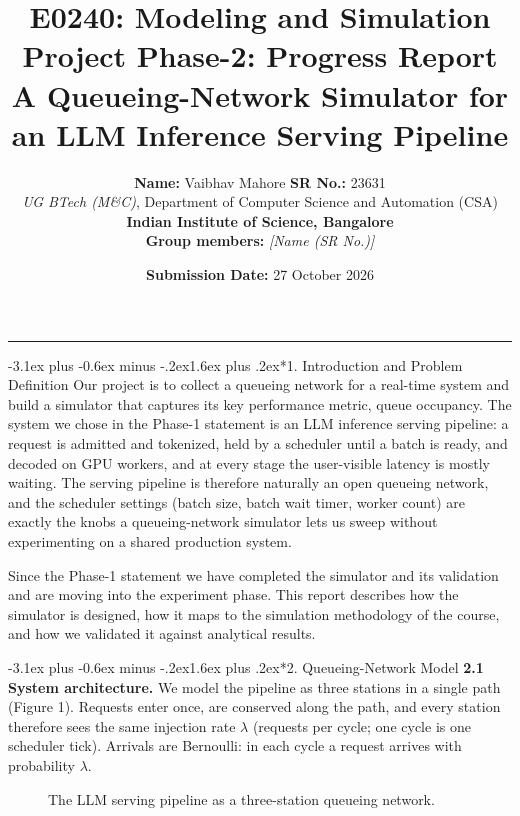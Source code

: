 \documentclass[11pt,a4paper]{article}
\title{\vspace{-2.2em}\textbf{\huge E0240: Modeling and Simulation}\\[0.4em]
\Large \textbf{Project Phase-2: Progress Report}\\[0.3em]
\large A Queueing-Network Simulator for an LLM Inference Serving Pipeline}
\author{\textbf{Name:} Vaibhav Mahore \quad \textbf{SR No.:} 23631\\[0.2em]
\textit{UG BTech (M\&C)}, Department of Computer Science and Automation (CSA)\\[0.2em]
\textbf{Indian Institute of Science, Bangalore}\\[0.2em]
\textbf{Group members:} \textit{[Name (SR No.)] \quad [Name (SR No.)]}}
\date{\textbf{Submission Date:} 27 October 2026}
\makeatletter
\renewcommand\section{\@startsection{section}{1}{\z@}%
  {-3.1ex plus -0.6ex minus -.2ex}{1.6ex plus .2ex}{\normalfont\Large\bfseries}}
\makeatother
\begin{document}
\maketitle
\vspace{-0.4em}
\hrule
\vspace{1.2em}

\section*{1. Introduction and Problem Definition}
Our project is to collect a queueing network for a real-time system and build a
simulator that captures its key performance metric, queue occupancy. The system
we chose in the Phase-1 statement is an LLM inference serving pipeline: a
request is admitted and tokenized, held by a scheduler until a batch is ready,
and decoded on GPU workers, and at every stage the user-visible latency is
mostly waiting. The serving pipeline is therefore naturally an open queueing
network, and the scheduler settings (batch size, batch wait timer, worker
count) are exactly the knobs a queueing-network simulator lets us sweep
without experimenting on a shared production system.

Since the Phase-1 statement we have completed the simulator and its validation
and are moving into the experiment phase. This report describes how the
simulator is designed, how it maps to the simulation methodology of the
course, and how we validated it against analytical results.

\section*{2. Queueing-Network Model}
\textbf{2.1 System architecture.} We model the pipeline as three stations in a
single path (Figure 1). Requests enter once, are conserved along the path, and
every station therefore sees the same injection rate $\lambda$ (requests per
cycle; one cycle is one scheduler tick). Arrivals are Bernoulli: in each cycle
a request arrives with probability $\lambda$.

\begin{figure}[H]
\centering
{}
\caption{The LLM serving pipeline as a three-station queueing network.}
\end{figure}
\end{document}
